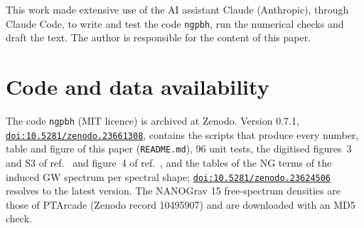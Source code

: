 \documentclass[a4paper,11pt]{article}
\begin{document}
\acknowledgments

This work made extensive use of the AI assistant Claude (Anthropic), through Claude Code, to write
and test the code \texttt{ngpbh}, run the numerical checks and draft the text. The author is
responsible for the content of this paper.

\section*{Code and data availability}

The code \texttt{ngpbh} (MIT licence) is archived at Zenodo. Version 0.7.1,
\href{https://doi.org/10.5281/zenodo.23661308}{\nolinkurl{doi:10.5281/zenodo.23661308}},
contains the scripts that produce every number, table and figure of this paper
(\texttt{README.md}), 96 unit tests, the digitised figures~3 and S3 of ref.~\cite{FIVT23} and
figure~4 of ref.~\cite{ALW21}, and the tables of the NG terms of the induced GW spectrum per
spectral shape; \href{https://doi.org/10.5281/zenodo.23624506}{\nolinkurl{doi:10.5281/zenodo.23624506}}
resolves to the latest version. The NANOGrav 15 free-spectrum densities are those of PTArcade (Zenodo record 10495907)
and are downloaded with an MD5 check.



\end{document}
